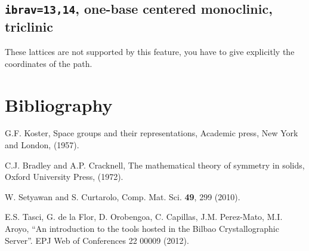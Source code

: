 \documentclass[12pt,a4paper]{article}
\begin{document}
\subsection{\texttt{ibrav=13,14}, one-base centered monoclinic,
triclinic}
These lattices are not supported by this feature, you have to give
explicitly the coordinates of the path.

\section{Bibliography}

\noindent [1] G.F. Koster, Space groups and their representations, Academic press,
New York and London, (1957). 

\noindent [2] C.J. Bradley and A.P. Cracknell, The mathematical theory of symmetry
in solids, Oxford University Press, (1972).

\noindent [3] W. Setyawan and S. Curtarolo, Comp. Mat. Sci.  {\bf 49}, 299 (2010).

\noindent [4] E.S. Tasci, G. de la Flor, D. Orobengoa, C. Capillas, 
J.M. Perez-Mato, M.I. Aroyo, ``An introduction to the tools hosted in the 
Bilbao Crystallographic Server''. EPJ Web of Conferences 22 00009 (2012).
\end{document}
